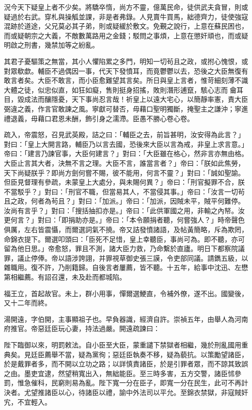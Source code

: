 \begin{pinyinscope}
況今天下疑皇上者不少矣。將驕卒惰，尚方不靈，億萬民命，徒供武夫貪冒，則或疑過於右武。穿札與操觚並課，非是者弗錄。人見賣牛買馬，絀德齊力，徒使強寇混跡於道途，父兄莫必其子弟，則或疑緩於敷文。免覲之說行，上意在蘇民困也，而或疑朝宗之大義，不敵數萬路用之金錢；駁問之事煩，上意在懲奸頑也，而或疑明啟之刑書，幾禁加等之紛亂。

其君子憂驅策之無當，其小人懼陷累之多門，明知一切茍且之政，或拊心愧恨，或對眾欷歔。輔臣不過偶因一事，代天下發憤耳，而竟鬱鬱以去，恐後之大臣無復有敢言者矣。大臣不敢言，而小臣愈難望其言矣。所日與皇上言者，惟苛細刻薄不識大體之徒，似忠似直，如狂如癡，售則挺身招搖，敗則潛形逋竄，駭心志而龠耳目，毀成法而釀隱憂，天下事尚忍言哉！祈皇上以遠大宅心，以簡靜率憲，責大臣弼違之義，作言官敢諫之風。寧獻可替否，毋藉口聖明獨斷，掩聖主之謙沖；寧進禮退義，毋藉口君恩未酬，飾引身之濡滯。臣愚不勝心卷心卷。

疏入，帝震怒，召見武英殿，詰之曰：「輔臣之去，前旨甚明，汝安得為此言？」對曰：「皇上大開言路，輔臣乃以言去國，恐後來大臣以言為戒，非皇上求言意。」帝曰：「建言乃諫官事，大臣何建言？」對曰：「大臣雖在格心，然非言亦無由格。大臣止言其大者，決無不言之理。大臣不言，誰當言者？」帝曰：「朕如此焦勞，天下尚疑朕乎？即尚方劍何嘗不賜，彼不能用，何言不靈？」對曰：「誠如聖諭。但臣見督理有參疏，未蒙皇上大處分，與未賜何異？」帝曰：「刑官擬罪不合，朕不當駁乎？」對曰：「刑官不職，但當易其人，不當侵其事。」帝曰：「汝言一切茍且之政，何者為茍且？」對曰：「加派。」帝曰：「加派，因賊未平，賊平何難停。汝尚有言乎？」對曰：「搜括抽扣亦是。」帝曰：「此供軍國之用，非輸之內帑。汝更何言？」對曰：「即捐助亦是。」帝曰：「本令願捐者聽，何嘗強人？」時帝聲色俱厲，左右皆震懾，而爾選詞氣不撓。帝又詰發憤諸語，及帖黃簡略，斥為欺罔，命錦衣提下。爾選叩頭曰：「臣死不足惜，皇上幸聽臣，事尚可為。即不聽，亦可留為他日思。」帝愈怒，罪且不測，諸大臣力救，乃命繫於直廬。明日下都察院議罪，議止停俸。帝以語涉誇詡，并罪視草御史張三謨，令吏部同議。請鐫五級，以雜職用。復不許，乃削籍歸。自後言者屢薦，皆不聽。十五年，給事中沈迅、左懋第相繼薦。有詔召還，未及赴而都城陷。

福王立，首起故官。未上，群小用事，憚爾選鯁直，令補外僚，遂不出。國變後，又十二年而終。

湯開遠，字伯開，主事顯祖子也。早負器識，經濟自許。崇禎五年，由舉人為河南府推官。帝惡廷臣玩心妻，持法過嚴。開遠疏諫曰：

陛下臨御以來，明罰敕法。自小臣至大臣，蒙重譴下禁獄者相繼，幾於刑亂國用重典矣。見廷臣薦舉不當，疑為黨徇；惡廷臣執奏不移，疑為藐抗。以策勵望諸臣，於是戴罪者多，而不開以立功之路；以詳慎責諸臣，於是引罪者眾，而不諒其致誤之由。墨吏宜逮，然望稍寬出入，無絀能臣。至三時多害，五方交警，諸臣怵參罰，惟急催科，民窮則易為亂。陛下寬一分在臣子，即寬一分在民生，此可不再計決者。尤望推諸臣以心，待諸臣以禮，諭中外法司以平允。至錦衣禁獄，非寇賊奸宄，不宜輕入。


\end{pinyinscope}
